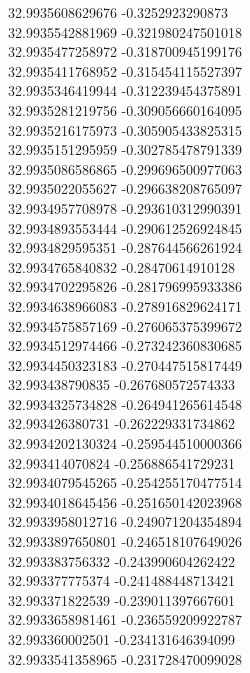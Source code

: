 {32.9935608629676	-0.3252923290873\\
32.9935542881969	-0.321980247501018\\
32.9935477258972	-0.318700945199176\\
32.9935411768952	-0.315454115527397\\
32.9935346419944	-0.312239454375891\\
32.9935281219756	-0.309056660164095\\
32.9935216175973	-0.305905433825315\\
32.9935151295959	-0.302785478791339\\
32.9935086586865	-0.299696500977063\\
32.9935022055627	-0.296638208765097\\
32.9934957708978	-0.293610312990391\\
32.9934893553444	-0.290612526924845\\
32.9934829595351	-0.287644566261924\\
32.9934765840832	-0.28470614910128\\
32.9934702295826	-0.281796995933386\\
32.9934638966083	-0.278916829624171\\
32.9934575857169	-0.276065375399672\\
32.9934512974466	-0.273242360830685\\
32.9934450323183	-0.270447515817449\\
32.993438790835	-0.267680572574333\\
32.9934325734828	-0.264941265614548\\
32.993426380731	-0.262229331734862\\
32.9934202130324	-0.259544510000366\\
32.993414070824	-0.256886541729231\\
32.9934079545265	-0.254255170477514\\
32.9934018645456	-0.251650142023968\\
32.9933958012716	-0.249071204354894\\
32.9933897650801	-0.246518107649026\\
32.993383756332	-0.243990604262422\\
32.993377775374	-0.241488448713421\\
32.993371822539	-0.239011397667601\\
32.9933658981461	-0.236559209922787\\
32.993360002501	-0.234131646394099\\
32.9933541358965	-0.231728470099028\\
}
